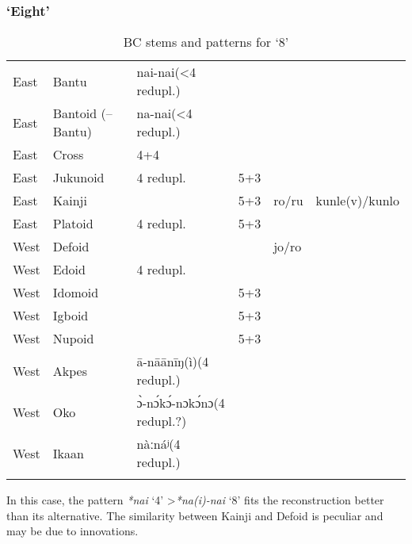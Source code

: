 \subsubsection{‘Eight’}\label{sec:3.1.4.6}
\begin{table}
\caption{\label{tab:3:59}BC stems and patterns for `8'}


\begin{tabularx}{\textwidth}{llQlll}
\lsptoprule

East & {Bantu} & nai-nai\newline (<4 redupl.) &   &   &  \\
East & {Bantoid} {(–Bantu)} & na-nai\newline (<4 redupl.) &   &   &  \\
East & {Cross} & 4+4 &   &   &  \\
East & {Jukunoid} & 4 redupl. & 5+3 &   &  \\
East & {Kainji} &   & 5+3 & ro/ru & kunle(v)/kunlo\\
East & {Platoid} & 4 redupl. & 5+3 &   &  \\
West & {Defoid} &   &   & jo/ro &  \\
West & {Edoid} & 4 redupl. &   &   &  \\
West & {Idomoid} &   & 5+3 &   &  \\
West & {Igboid} &   & 5+3 &   &  \\
West & {Nupoid} &   & 5+3 &   &  \\
West & {Akpes} & ā-nāānīŋ(ì)\newline (4 redupl.) &   &   &  \\
West & {Oko} & {\`{ɔ}}-n{\'{ɔ}}k{\'{ɔ}}-nɔk{\'{ɔ}}nɔ\newline(4 redupl.?) &   &   &  \\
West & {Ikaan} & nàːnáʲ\newline (4 redupl.) &   &   &  \\
\lspbottomrule
\end{tabularx}
\end{table}
In this case, the pattern \textit{*nai} ‘4’ >\textit{*na(i)-nai} ‘8’ fits the reconstruction better than its alternative. The similarity between Kainji and Defoid is peculiar and may be due to innovations. 

\clearpage
